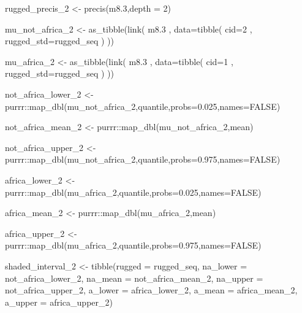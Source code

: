 \documentclass[
]{book}
\newenvironment{Shaded}{\begin{snugshade}}{\end{snugshade}}
\newcommand{\AttributeTok}[1]{\textcolor[rgb]{0.77,0.63,0.00}{#1}}
\newcommand{\ConstantTok}[1]{\textcolor[rgb]{0.00,0.00,0.00}{#1}}
\newcommand{\DecValTok}[1]{\textcolor[rgb]{0.00,0.00,0.81}{#1}}
\newcommand{\FloatTok}[1]{\textcolor[rgb]{0.00,0.00,0.81}{#1}}
\newcommand{\FunctionTok}[1]{\textcolor[rgb]{0.00,0.00,0.00}{#1}}
\newcommand{\NormalTok}[1]{#1}
\newcommand{\OtherTok}[1]{\textcolor[rgb]{0.56,0.35,0.01}{#1}}
\newcommand{\SpecialCharTok}[1]{\textcolor[rgb]{0.00,0.00,0.00}{#1}}
\begin{document}
\begin{Shaded}
\begin{Highlighting}[]
\NormalTok{rugged\_precis\_2 }\OtherTok{\textless{}{-}} \FunctionTok{precis}\NormalTok{(m8}\FloatTok{.3}\NormalTok{,}\AttributeTok{depth =} \DecValTok{2}\NormalTok{)}

\NormalTok{mu\_not\_africa\_2 }\OtherTok{\textless{}{-}} \FunctionTok{as\_tibble}\NormalTok{(}\FunctionTok{link}\NormalTok{( m8}\FloatTok{.3}\NormalTok{ ,}
\AttributeTok{data=}\FunctionTok{tibble}\NormalTok{( }\AttributeTok{cid=}\DecValTok{2}\NormalTok{ , }\AttributeTok{rugged\_std=}\NormalTok{rugged\_seq ) ))}

\NormalTok{mu\_africa\_2 }\OtherTok{\textless{}{-}} \FunctionTok{as\_tibble}\NormalTok{(}\FunctionTok{link}\NormalTok{( m8}\FloatTok{.3}\NormalTok{ ,}
\AttributeTok{data=}\FunctionTok{tibble}\NormalTok{( }\AttributeTok{cid=}\DecValTok{1}\NormalTok{ , }\AttributeTok{rugged\_std=}\NormalTok{rugged\_seq ) ))}

\NormalTok{not\_africa\_lower\_2 }\OtherTok{\textless{}{-}}\NormalTok{ purrr}\SpecialCharTok{::}\FunctionTok{map\_dbl}\NormalTok{(mu\_not\_africa\_2,quantile,}\AttributeTok{probs=}\FloatTok{0.025}\NormalTok{,}\AttributeTok{names=}\ConstantTok{FALSE}\NormalTok{)}

\NormalTok{not\_africa\_mean\_2 }\OtherTok{\textless{}{-}}\NormalTok{ purrr}\SpecialCharTok{::}\FunctionTok{map\_dbl}\NormalTok{(mu\_not\_africa\_2,mean)}

\NormalTok{not\_africa\_upper\_2 }\OtherTok{\textless{}{-}}\NormalTok{ purrr}\SpecialCharTok{::}\FunctionTok{map\_dbl}\NormalTok{(mu\_not\_africa\_2,quantile,}\AttributeTok{probs=}\FloatTok{0.975}\NormalTok{,}\AttributeTok{names=}\ConstantTok{FALSE}\NormalTok{)}



\NormalTok{africa\_lower\_2 }\OtherTok{\textless{}{-}}\NormalTok{ purrr}\SpecialCharTok{::}\FunctionTok{map\_dbl}\NormalTok{(mu\_africa\_2,quantile,}\AttributeTok{probs=}\FloatTok{0.025}\NormalTok{,}\AttributeTok{names=}\ConstantTok{FALSE}\NormalTok{)}

\NormalTok{africa\_mean\_2 }\OtherTok{\textless{}{-}}\NormalTok{ purrr}\SpecialCharTok{::}\FunctionTok{map\_dbl}\NormalTok{(mu\_africa\_2,mean)}

\NormalTok{africa\_upper\_2 }\OtherTok{\textless{}{-}}\NormalTok{ purrr}\SpecialCharTok{::}\FunctionTok{map\_dbl}\NormalTok{(mu\_africa\_2,quantile,}\AttributeTok{probs=}\FloatTok{0.975}\NormalTok{,}\AttributeTok{names=}\ConstantTok{FALSE}\NormalTok{)}


\NormalTok{shaded\_interval\_2 }\OtherTok{\textless{}{-}} \FunctionTok{tibble}\NormalTok{(}\AttributeTok{rugged =}\NormalTok{ rugged\_seq, }\AttributeTok{na\_lower =}\NormalTok{ not\_africa\_lower\_2, }\AttributeTok{na\_mean =}\NormalTok{ not\_africa\_mean\_2, }\AttributeTok{na\_upper =}\NormalTok{ not\_africa\_upper\_2,}
                                               \AttributeTok{a\_lower =}\NormalTok{ africa\_lower\_2, }\AttributeTok{a\_mean =}\NormalTok{ africa\_mean\_2, }\AttributeTok{a\_upper =}\NormalTok{ africa\_upper\_2)}
\end{Highlighting}
\end{Shaded}
\end{document}
